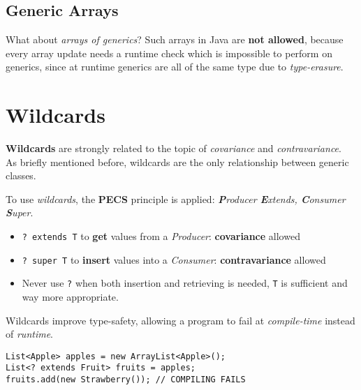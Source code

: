 \subsection{Generic Arrays}
What about \textit{arrays of generics}?
Such arrays in Java are \textbf{not allowed},
because every array update needs a runtime check which is impossible to perform on generics,
since at runtime generics are all of the same type due to \textit{type-erasure}.

\section{Wildcards}
\textbf{Wildcards} are strongly related to the topic of \textit{covariance} and \textit{contravariance}.\\
As briefly mentioned before, wildcards are the only relationship between generic classes.

To use \textit{wildcards}, the \textbf{PECS} principle is applied:
\textit{\textbf{P}roducer \textbf{E}xtends, \textbf{C}onsumer \textbf{S}uper}.
\begin{itemize}
   \item \lstinline|? extends T| to \textbf{get} values from a \textit{Producer}: \textbf{covariance} allowed
   \item \lstinline|? super T| to \textbf{insert} values into a \textit{Consumer}: \textbf{contravariance} allowed
   \item Never use \lstinline|?| when both insertion and retrieving is needed, \lstinline|T| is sufficient and way more appropriate.
\end{itemize}

Wildcards improve type-safety, allowing a program to fail at \textit{compile-time} instead of \textit{runtime}.
\begin{lstlisting}
List<Apple> apples = new ArrayList<Apple>();
List<? extends Fruit> fruits = apples;
fruits.add(new Strawberry()); // COMPILING FAILS
\end{lstlisting}

